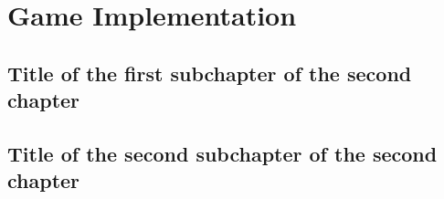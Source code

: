 \chapter{Game Implementation}

\section{Title of the first subchapter of the second chapter}

\section{Title of the second subchapter of the second chapter}
